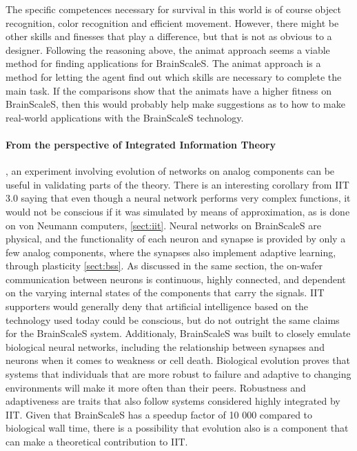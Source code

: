 The specific competences necessary for survival in this world is of course object recognition, color recognition and efficient movement.
However, there might be other skills and finesses that play a difference, but that is not as obvious to a designer.
Following the reasoning above, the animat approach seems a viable method for finding applications for BrainScaleS.
The animat approach is a method for letting the agent find out which skills are necessary to complete the main task.
If the comparisons show that the animats have a higher fitness on BrainScaleS, then this would probably help make suggestions as to how to make real-world applications with the BrainScaleS technology.

\paragraph{From the perspective of Integrated Information Theory}, an experiment involving evolution of networks on analog components can be useful in validating parts of the theory.
There is an interesting corollary from IIT 3.0 saying that even though a neural network performs very complex functions, it would not be conscious if it was simulated by means of approximation, as is done on von Neumann computers, \vref{sect:iit}.
Neural networks on BrainScaleS are physical, and the functionality of each neuron and synapse is provided by only a few analog components, where the synapses also implement adaptive learning, through plasticity \vref{sect:bss}.
As discussed in the same section, the on-wafer communication between neurons is continuous, highly connected, and dependent on the varying internal states of the components that carry the signals.
IIT supporters would generally deny that artificial intelligence based on the technology used today could be conscious, but do not outright the same claims for the BrainScaleS system.
Additionaly, BrainScaleS was built to closely emulate biological neural networks, including the relationship between synapses and neurons when it comes to weakness or cell death.
Biological evolution proves that systems that individuals that are more robust to failure and adaptive to changing environments will make it more often than their peers.
Robustness and adaptiveness are traits that also follow systems considered highly integrated by IIT.
Given that BrainScaleS has a speedup factor of 10 000 compared to biological wall time, there is a possibility that evolution also is a component that can make a theoretical contribution to IIT.

